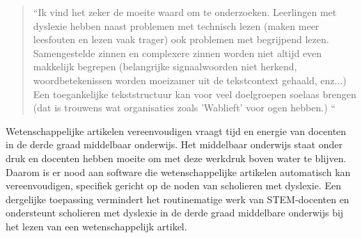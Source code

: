 \begin{quote}
	“Ik vind het zeker de moeite waard om te onderzoeken. Leerlingen met dyslexie hebben naast problemen met technisch lezen (maken meer leesfouten en lezen vaak trager) ook problemen met begrijpend lezen. Samengestelde zinnen en complexere zinnen worden niet altijd even makkelijk begrepen (belangrijke signaalwoorden niet herkend, woordbetekenissen worden moeizamer uit de tekstcontext gehaald, enz...) Een toegankelijke tekststructuur kan voor veel doelgroepen soelaas brengen (dat is trouwens wat organisaties zoals 'Wablieft' voor ogen hebben.) “
\end{quote}

Wetenschappelijke artikelen vereenvoudigen vraagt tijd en energie van docenten in de derde graad middelbaar onderwijs. Het middelbaar onderwijs staat onder druk en docenten hebben moeite om met deze werkdruk boven water te blijven. Daarom is er nood aan software die wetenschappelijke artikelen automatisch kan vereenvoudigen, specifiek gericht op de noden van scholieren met dyslexie. Een dergelijke toepassing vermindert het routinematige werk van STEM-docenten en ondersteunt scholieren met dyslexie in de derde graad middelbare onderwijs bij het lezen van een wetenschappelijk artikel.

\section{}%
\label{sec:onderzoeksvraag}




